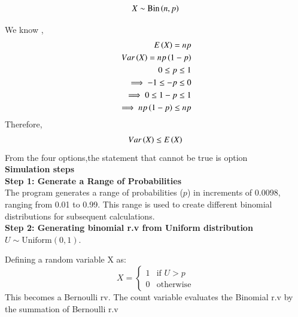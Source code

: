 \documentclass[journal,12pt,twocolumn]{IEEEtran}
\begin{document}
\solution
\begin{align}
X \sim \text{Bin}\left(n,p\right) \nonumber
\end{align}

We know ,
\begin{align} 
	E\left(X\right)=np\\
	Var\left(X\right)=np\left(1-p\right)\\
	0\leq p\leq1 \\
	\implies -1\leq -p \leq0\\
	\implies
	0 \leq 1-p \leq1\\
	\implies np\left(1-p\right)\leq np
\end{align}
Therefore,
\begin{align} 
	Var\left(X\right)\leq E\left(X\right)
\end{align}
From the four options,the statement that cannot be true is option \\

\textbf{Simulation steps}\\
\textbf{Step 1: Generate a Range of Probabilities}\\
The program generates a range of probabilities (\(p\)) in increments of 0.0098, ranging from 0.01 to 0.99. This range is used to create different binomial distributions for subsequent calculations.
\\
\textbf{Step 2: Generating binomial r.v from Uniform distribution}\\
\( U \sim \text{Uniform}(0, 1) \).

Defining a random variable X as:
\[
X = 
\begin{cases}
    1 & \text{if } U > p \\
    0 & \text{otherwise}
\end{cases}
\]
This becomes a Bernoulli rv.
The count variable evaluates the Binomial r.v by the summation of Bernoulli r.v
\end{document}

